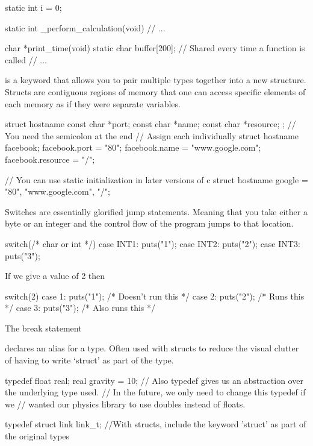 \begin{code}[language=C]
static int i = 0;

static int _perform_calculation(void) {
  // ...
}

char *print_time(void) {
  static char buffer[200]; // Shared every time a function is called
  // ...
}
\end{code}

\item {} is a keyword that allows you to pair multiple types together into a new structure. Structs are contiguous regions of memory that one can access specific elements of each memory as if they were separate variables.

\begin{code}[language=C]
struct hostname {
  const char *port;
  const char *name;
  const char *resource;
}; // You need the semicolon at the end
// Assign each individually
struct hostname facebook;
facebook.port = "80";
facebook.name = "www.google.com";
facebook.resource = "/";

// You can use static initialization in later versions of c
struct hostname google = {"80", "www.google.com", "/"};
\end{code}


\item {} Switches are essentially glorified jump statements. Meaning that you take either a byte or an integer and the control flow of the program jumps to that location.
\\
\begin{code}[language=C]
switch(/* char or int */) {
  case INT1: puts("1");
  case INT2: puts("2");
  case INT3: puts("3");
}
\end{code}

If we give a value of 2 then
\\
\begin{code}[language=C]
switch(2) {
  case 1: puts("1"); /* Doesn't run this */
  case 2: puts("2"); /* Runs this */
  case 3: puts("3"); /* Also runs this */
}
\end{code}

The break statement
\item {} declares an alias for a type. Often used with structs to reduce the visual clutter of having to write `struct' as part of the type.

\begin{code}[language=C]
typedef float real; 
real gravity = 10;
// Also typedef gives us an abstraction over the underlying type used. 
// In the future, we only need to change this typedef if we
// wanted our physics library to use doubles instead of floats.

typedef struct link link_t; 
//With structs, include the keyword 'struct' as part of the original types
\end{code}

